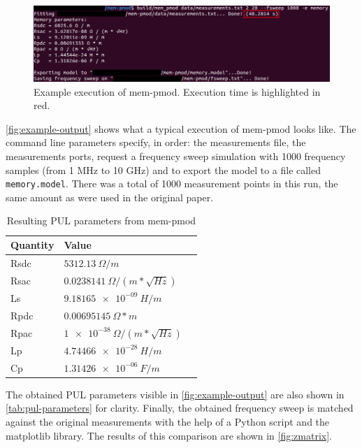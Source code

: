 \begin{figure}[htbp]
    \center
    \includegraphics[width = \textwidth]{img/example_output}
    \caption{Example execution of mem-pmod. Execution time is highlighted in red.}
    \label{fig:example-output}
\end{figure}
\autoref{fig:example-output} shows what a typical execution of mem-pmod looks like. The command line parameters specify, in order: the measurements file, the measurements ports, request a frequency sweep simulation with 1000 frequency samples (from 1 MHz to 10 GHz) and to export the model to a file called \texttt{memory.model}. There was a total of 1000 measurement points in this run, the same amount as were used in the original paper.
\begin{table}[htbp]
    \center
    \begin{tabular}{|l|l|l|}
        \hline
        Quantity & Value \\ \hline
        Rsdc & $\SI{5312.13}{\Omega / m}$ \\ \hline
        Rsac & $\SI{0.0238141}{\Omega / (m * \sqrt{Hz})}$ \\ \hline
        Ls   & $\SI{9.18165e-09}{H / m}$ \\ \hline
        Rpdc & $\SI{0.00695145}{\Omega * m}$ \\ \hline
        Rpac & $\SI{1e-38}{\Omega / (m * \sqrt{Hz})}$ \\ \hline
        Lp   & $\SI{4.74466e-28}{H / m}$ \\ \hline
        Cp   & $\SI{1.31426e-06}{F / m}$ \\ \hline
    \end{tabular}
    \caption{Resulting PUL parameters from mem-pmod}
    \label{tab:pul-parameters}
\end{table}
The obtained PUL parameters visible in \autoref{fig:example-output} are also shown in \autoref{tab:pul-parameters} for clarity. Finally, the obtained frequency sweep is matched against the original measurements with the help of a Python script and the matplotlib library. The results of this comparison are shown in \autoref{fig:zmatrix}.

